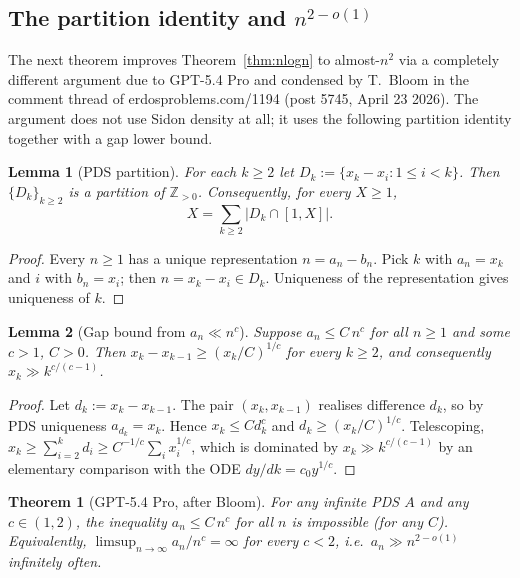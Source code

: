 \documentclass[11pt]{article}
\newtheorem{theorem}{Theorem}
\newtheorem{lemma}{Lemma}
\begin{document}
\subsection{The partition identity and $n^{2-o(1)}$}

The next theorem improves Theorem~\ref{thm:nlogn} to almost-$n^2$ via
a completely different argument due to GPT-5.4 Pro and condensed by
T.~Bloom in the comment thread of erdosproblems.com/1194
(post 5745, April 23 2026). The argument does not use Sidon density
at all; it uses the following partition identity together with a gap
lower bound.

\begin{lemma}[PDS partition]\label{lem:partition}
For each $k \geq 2$ let $D_k := \{x_k - x_i : 1 \leq i < k\}$. Then
$\{D_k\}_{k \geq 2}$ is a partition of $\mathbb{Z}_{> 0}$. Consequently,
for every $X \geq 1$,
\[
   X = \sum_{k \geq 2} |D_k \cap [1, X]|.
\]
\end{lemma}

\begin{proof}
Every $n \geq 1$ has a unique representation $n = a_n - b_n$. Pick $k$
with $a_n = x_k$ and $i$ with $b_n = x_i$; then $n = x_k - x_i \in D_k$.
Uniqueness of the representation gives uniqueness of $k$.
\end{proof}

\begin{lemma}[Gap bound from $a_n \ll n^c$]\label{lem:gap}
Suppose $a_n \leq C\, n^c$ for all $n \geq 1$ and some $c > 1$, $C > 0$.
Then $x_k - x_{k-1} \geq (x_k/C)^{1/c}$ for every $k \geq 2$, and
consequently $x_k \gg k^{c/(c-1)}$.
\end{lemma}

\begin{proof}
Let $d_k := x_k - x_{k-1}$. The pair $(x_k, x_{k-1})$ realises difference
$d_k$, so by PDS uniqueness $a_{d_k} = x_k$. Hence
$x_k \leq C d_k^c$ and $d_k \geq (x_k/C)^{1/c}$. Telescoping,
$x_k \geq \sum_{i=2}^k d_i \geq C^{-1/c} \sum_i x_i^{1/c}$, which is
dominated by $x_k \gg k^{c/(c-1)}$ by an elementary comparison with the
ODE $dy/dk = c_0 y^{1/c}$.
\end{proof}

\begin{theorem}[GPT-5.4 Pro, after Bloom]\label{thm:n2io}
For any infinite PDS $A$ and any $c \in (1, 2)$, the inequality
$a_n \leq C\, n^c$ for all $n$ is impossible (for any $C$). Equivalently,
$\limsup_{n \to \infty} a_n/n^c = \infty$ for every $c < 2$, i.e.\
$a_n \gg n^{2-o(1)}$ infinitely often.
\end{theorem}
\end{document}
